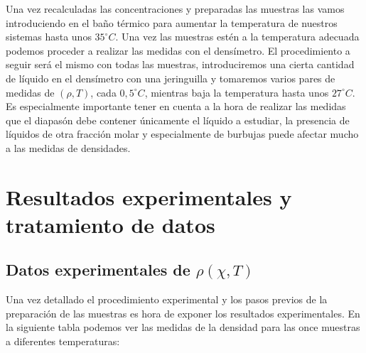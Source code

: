 \documentclass[a4paper,12pt,titlepage]{article}
\begin{document}
Una vez recalculadas las concentraciones y preparadas las muestras las vamos introduciendo en el baño térmico para aumentar la temperatura de nuestros sistemas hasta unos $35^{\circ}C$. Una vez las muestras estén a la temperatura adecuada podemos proceder a realizar las medidas con el densímetro. El procedimiento a seguir será el mismo con todas las muestras, introduciremos una cierta cantidad de líquido en el densímetro con una jeringuilla y tomaremos varios pares de medidas de $(\rho,T)$, cada $0,5^{\circ}C$, mientras baja la temperatura hasta unos $27^{\circ}C$. Es especialmente importante tener en cuenta a la hora de realizar las medidas que el diapasón debe contener únicamente el líquido a estudiar, la presencia de líquidos de otra fracción molar y especialmente de burbujas puede afectar mucho a las medidas de densidades.


\section{Resultados experimentales y tratamiento de datos}

\subsection{Datos experimentales de $\rho(\chi,T)$}

Una vez detallado el procedimiento experimental y los pasos previos de la preparación de las muestras es hora de exponer los resultados experimentales. En la siguiente tabla podemos ver las medidas de la densidad para las once muestras a diferentes temperaturas:

\newpage
\end{document}
